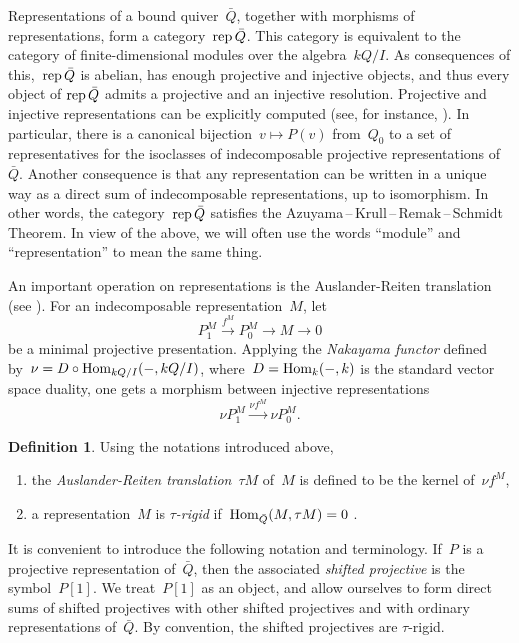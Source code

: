 \documentclass{memo-l}
\theoremstyle{definition}
\newtheorem{definition}[theorem]{Definition}
\newcommand{\darkblue}{\color{darkblue}} %
\newcommand{\defn}[1]{\textsl{\darkblue #1}} %
\newcommand{\Hom}[1]{\operatorname{{\rm Hom}}_{#1}}
\newcommand{\rep}{\operatorname{{\rm rep}}}
\begin{document}
Representations of a bound quiver~$\bar Q$, together with morphisms of representations, form a category~$\rep \bar Q$.
This category is equivalent to the category of finite-dimensional modules over the algebra~$kQ/I$.
As consequences of this,~$\rep \bar Q$ is abelian, has enough projective and injective objects, and thus every object of $\rep \bar Q$ admits a projective and an injective resolution.
Projective and injective representations can be explicitly computed (see, for instance, \cite[Chapter III.2]{AssemSimsonSkowronski}).
In particular, there is a canonical bijection~$v\mapsto P(v)$ from~$Q_0$ to a set of representatives for the isoclasses of indecomposable projective representations of~$\bar Q$.
Another consequence is that any representation can be written in a unique way as a direct sum of indecomposable representations, up to isomorphism.
In other words, the category~$\rep \bar Q$ satisfies the \mbox{Azuyama\,--\,Krull\,--\,Remak\,--\,Schmidt} Theorem.
In view of the above, we will often use the words ``module'' and ``representation'' to mean the same thing.

An important operation on representations is the Auslander-Reiten translation (see \cite[Chap.~IV]{AssemSimsonSkowronski}).  For an indecomposable representation~$M$, let 
\[
 P_1^M \stackrel{f^M}{\to} P_0^M \to M \to 0 
\]
be a minimal projective presentation.  Applying the \defn{Nakayama functor} defined by~${\nu = D\circ \Hom{kQ/I}(-, kQ/I)}$, where~$D = \Hom{k}(-, k)$ is the standard vector space duality, one gets a morphism between injective representations
\[
\nu P_1^M \stackrel{\nu f^M}{\longrightarrow} \nu P_0^M.
\]
\begin{definition}
Using the notations introduced above,
 \begin{enumerate}
  \item the \defn{Auslander-Reiten translation}~$\tau M$ of~$M$ is defined to be the kernel of~$\nu f^M$,
  \item a representation~$M$ is \defn{$\tau$-rigid} if~$\Hom{\bar Q}(M, \tau M) = 0$ \cite{AdachiIyamaReiten}.
 \end{enumerate}
\end{definition} 

It is convenient to introduce the following notation and terminology.  If~$P$ is a projective representation of~$\bar Q$, then the associated \defn{shifted projective} is the symbol~$P[1]$.  We treat~$P[1]$ as an object, and allow ourselves to form direct sums of shifted projectives with other shifted projectives and with ordinary representations of~$\bar Q$.  By convention, the shifted projectives are $\tau$-rigid.
\end{document}
